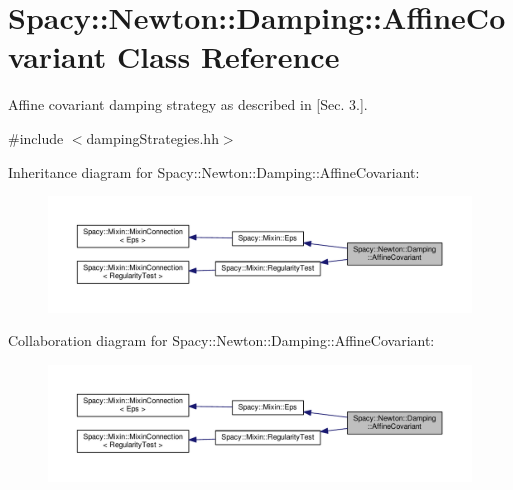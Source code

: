 \hypertarget{classSpacy_1_1Newton_1_1Damping_1_1AffineCovariant}{\section{Spacy\-:\-:Newton\-:\-:Damping\-:\-:Affine\-Covariant Class Reference}
\label{classSpacy_1_1Newton_1_1Damping_1_1AffineCovariant}
}


Affine covariant damping strategy as described in \cite{Deuflhard2004} \mbox{[}Sec. 3.\mbox{]}.  




{\ttfamily \#include $<$damping\-Strategies.\-hh$>$}



Inheritance diagram for Spacy\-:\-:Newton\-:\-:Damping\-:\-:Affine\-Covariant\-:
\nopagebreak
\begin{figure}[H]
\begin{center}
\leavevmode
\includegraphics[width=350pt]{classSpacy_1_1Newton_1_1Damping_1_1AffineCovariant__inherit__graph}
\end{center}
\end{figure}


Collaboration diagram for Spacy\-:\-:Newton\-:\-:Damping\-:\-:Affine\-Covariant\-:
\nopagebreak
\begin{figure}[H]
\begin{center}
\leavevmode
\includegraphics[width=350pt]{classSpacy_1_1Newton_1_1Damping_1_1AffineCovariant__coll__graph}
\end{center}
\end{figure}
